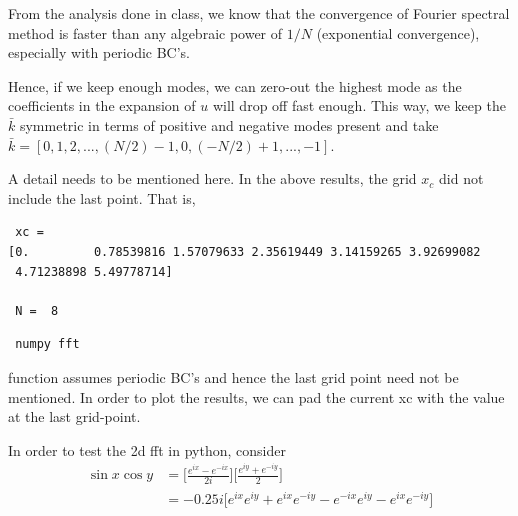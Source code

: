 \documentclass{article}
\begin{document}
From the analysis done in class, we know that the convergence of Fourier spectral method is faster than any algebraic power of $1/N$ (exponential convergence), especially with periodic BC's.

Hence, if we keep enough modes, we can zero-out the highest mode as the coefficients in the expansion of $u$ will drop off fast enough. This way, we keep the $\bar{k}$ symmetric in terms of positive and negative modes present and take $\bar{k} = [0, 1, 2, ..., (N/2)-1, 0, (-N/2)+1, ..., -1]$.

A detail needs to be mentioned here. In the above results, the grid $x_{c}$ did not include the last point. That is,

\begin{verbatim}
 xc = 
[0.         0.78539816 1.57079633 2.35619449 3.14159265 3.92699082
 4.71238898 5.49778714]
 
 N =  8
\end{verbatim}

\begin{verbatim} numpy fft \end{verbatim} function assumes periodic BC's and hence the last grid point need not be mentioned. In order to plot the results, we can pad the current xc with the value at the last grid-point. 

In order to test the 2d fft in python, consider 
\begin{align*}
 \sin {x} \cos{y} &= \big[\frac{e^{ix} - e^{-ix}}{2i}\big]\big[ \frac{e^{iy} + e^{-iy}}{2}\big]\\
                  &= -0.25 i \big[e^{ix}e^{iy} + e^{ix}e^{-iy} - e^{-ix}e^{iy} - e^{ix}e^{-iy}\big]
\end{align*}
\end{document}
